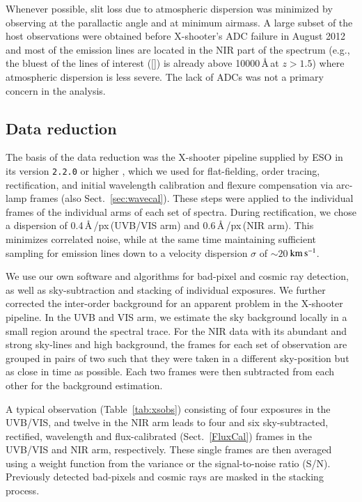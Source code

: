 \documentclass[traditabstract, longauth]{aa}
\newcommand{\kms}{$\rm{km\,s^{-1}}$}
\newcommand{\oii}{[\ion{O}{ii}]}
\begin{document}
Whenever possible, slit loss due to atmospheric dispersion was minimized by observing at the parallactic angle and at minimum airmass. A large subset of the host observations were obtained before X-shooter's ADC failure in August 2012 and most of the emission lines are located in the NIR part of the spectrum (e.g., the bluest of the lines of interest (\oii) is already above 10000\,\AA\,at $z>1.5$) where atmospheric dispersion is less severe. The lack of ADCs was not a primary concern in the analysis.

\subsection{Data reduction}

The basis of the data reduction was the X-shooter pipeline supplied by ESO in its version \texttt{2.2.0} or higher \citep{2006SPIE.6269E..80G, 2010SPIE.7737E..56M}, which we used for flat-fielding, order tracing, rectification, and initial wavelength calibration and flexure compensation via arc-lamp frames (also Sect.~\ref{sec:wavecal}). These steps were applied to the individual frames of the individual arms of each set of spectra. During rectification, we chose a dispersion of 0.4\,\AA\,/px\,(UVB/VIS arm) and 0.6\,\AA\,/px\,(NIR arm). This minimizes correlated noise, while at the same time maintaining sufficient sampling for emission lines down to a velocity dispersion $\sigma$ of $\sim20\,$\kms. 

We use our own software and algorithms for bad-pixel and cosmic ray detection, as well as sky-subtraction and stacking of individual exposures. We further corrected the inter-order background for an apparent problem in the X-shooter pipeline. In the UVB and VIS arm, we estimate the sky background locally in a small region around the spectral trace. For the NIR data with its abundant and strong sky-lines and high background, the frames for each set of observation are grouped in pairs of two such that they were taken in a different sky-position but as close in time as possible. Each two frames were then subtracted from each other for the background estimation.

A typical observation (Table~\ref{tab:xsobs}) consisting of four exposures in the UVB/VIS, and twelve in the NIR arm leads to four and six sky-subtracted, rectified, wavelength and flux-calibrated (Sect.~\ref{FluxCal}) frames in the UVB/VIS and NIR arm, respectively. These single frames are then averaged using a weight function from the variance or the signal-to-noise ratio (S/N). Previously detected bad-pixels and cosmic rays are masked in the stacking process.
\end{document}
